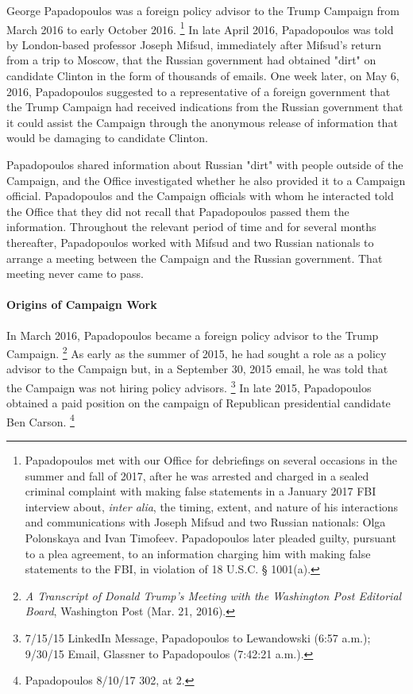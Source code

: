 George Papadopoulos was a foreign policy advisor to the Trump Campaign from March 2016 to early October 2016.%
\footnote{Papadopoulos met with our Office for debriefings on several occasions in the summer and fall of 2017, after he was arrested and charged in a sealed criminal complaint with making false statements in a January 2017 FBI interview about, \textit{inter alia}, the timing, extent, and nature of his interactions and communications with Joseph Mifsud and two Russian nationals: Olga Polonskaya and Ivan Timofeev.
Papadopoulos later pleaded guilty, pursuant to a plea agreement, to an information charging him with making false statements to the FBI, in violation of 18 U.S.C. § 1001(a).}
In late April 2016, Papadopoulos was told by London-based professor Joseph Mifsud, immediately after Mifsud's return from a trip to Moscow, that the Russian government had obtained "dirt" on candidate Clinton in the form of thousands of emails.
One week later, on May 6, 2016, Papadopoulos suggested to a representative of a foreign government that the Trump Campaign had received indications from the Russian government that it could assist the Campaign through the anonymous release of information that would be damaging to candidate Clinton.

Papadopoulos shared information about Russian "dirt" with people outside of the Campaign, and the Office investigated whether he also provided it to a Campaign official.
Papadopoulos and the Campaign officials with whom he interacted told the Office that they did not recall that Papadopoulos passed them the information.
Throughout the relevant period of time and for several months thereafter, Papadopoulos worked with Mifsud and two Russian nationals to arrange a meeting between the Campaign and the Russian government.
That meeting never came to pass.

\paragraph{Origins of Campaign Work}

In March 2016, Papadopoulos became a foreign policy advisor to the Trump Campaign.%
\footnote{\textit{A Transcript of Donald Trump’s Meeting with the Washington Post Editorial Board}, Washington Post (Mar. 21, 2016).}
As early as the summer of 2015, he had sought a role as a policy advisor to the Campaign but, in a September 30, 2015 email, he was told that the Campaign was not hiring policy advisors.%
\footnote{7/15/15 LinkedIn Message, Papadopoulos to Lewandowski (6:57 a.m.); 9/30/15 Email, Glassner to Papadopoulos (7:42:21 a.m.).}
In late 2015, Papadopoulos obtained a paid position on the campaign of Republican presidential candidate Ben Carson.%
\footnote{Papadopoulos 8/10/17 302, at 2.}

